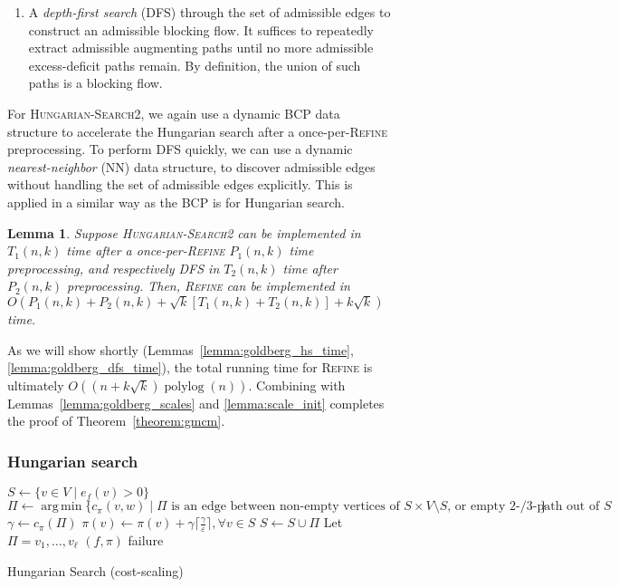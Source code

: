 \documentclass[11pt]{article}
\def\polylog{\mathop{\mathrm{polylog}}}
\def\eps{\varepsilon}
\DeclareMathOperator*{\argmin}{arg\,min}
\theoremstyle{plain}
\newtheorem{lemma}{Lemma}
\begin{document}
\begin{figure*}
\begin{enumerate}
\item A \emph{depth-first search} (\textsc{DFS}) through the set of admissible
	edges to construct an admissible blocking flow.
	It suffices to repeatedly extract admissible augmenting paths until
	no more admissible excess-deficit paths remain.
	By definition, the union of such paths is a blocking flow.
\end{enumerate}
For \textsc{Hungarian-Search2}, we again use a dynamic BCP data structure to
accelerate the Hungarian search after a once-per-\textsc{Refine} preprocessing.
To perform \textsc{DFS} quickly, we can use a dynamic \emph{nearest-neighbor}
(NN) data structure, to discover admissible edges without handling the set of
admissible edges explicitly.
This is applied in a similar way as the BCP is for Hungarian search.

\begin{lemma}
	Suppose \textsc{Hungarian-Search2} can be implemented in $T_1(n, k)$
	time after a once-per-\textsc{Refine} $P_1(n, k)$ time preprocessing,
	and respectively \textsc{DFS} in $T_2(n, k)$ time after $P_2(n, k)$
	preprocessing.
	Then, \textsc{Refine} can be implemented in
	$O(P_1(n, k) + P_2(n, k) + \sqrt{k}[T_1(n, k) + T_2(n, k)] + k\sqrt{k})$
	time.
\end{lemma}

As we will show shortly (Lemmas~\ref{lemma:goldberg_hs_time},
\ref{lemma:goldberg_dfs_time}), the total running time for \textsc{Refine}
is ultimately $O((n + k\sqrt{k})\polylog(n))$.
Combining with Lemmas~\ref{lemma:goldberg_scales} and \ref{lemma:scale_init}
completes the proof of Theorem~\ref{theorem:gmcm}.

\subsubsection{Hungarian search}

\begin{algorithm}
\caption{Hungarian Search (cost-scaling)}
\begin{algorithmic}[1]
	\State $S \gets \{v \in V \mid e_f(v) > 0\}$
	\Repeat
		\State $\Pi \gets \argmin\{c_\pi(v, w) \mid \text{$\Pi$ is an edge between non-empty vertices of $S \times V \setminus S$, or empty 2-/3-path out of $S$}\}$
		\State $\gamma \gets c_\pi(\Pi)$
			\State $\pi(v) \gets \pi(v) + \gamma\lceil\frac{\gamma}{\eps}\rceil, \forall v \in S$
		\EndIf
		\State $S \gets S \cup \Pi$
		\Statex %
		\State Let $\Pi = v_1, \ldots, v_\ell$
		 
			\State\Return $(f, \pi)$
		\EndIf
	\State\Return failure
\EndFunction
\end{algorithmic}
\end{algorithm}


\end{figure*}
\end{document}
